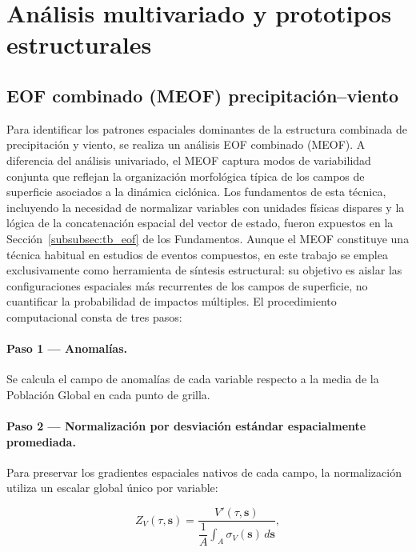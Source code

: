 
\section{Análisis multivariado y prototipos estructurales}\label{sec:meof_prototipos}

\subsection{EOF combinado (MEOF) precipitación--viento}\label{subsec:eof_multivariado}

Para identificar los patrones espaciales dominantes de la estructura combinada de precipitación y viento, se realiza un análisis EOF combinado (MEOF). A diferencia del análisis univariado, el MEOF captura modos de variabilidad conjunta que reflejan la organización morfológica típica de los campos de superficie asociados a la dinámica ciclónica. Los fundamentos de esta técnica, incluyendo la necesidad de normalizar variables con unidades físicas dispares y la lógica de la concatenación espacial del vector de estado, fueron expuestos en la Sección~\ref{subsubsec:tb_eof} de los Fundamentos. Aunque el MEOF constituye una técnica habitual en estudios de eventos compuestos, en este trabajo se emplea exclusivamente como herramienta de síntesis estructural: su objetivo es aislar las configuraciones espaciales más recurrentes de los campos de superficie, no cuantificar la probabilidad de impactos múltiples. El procedimiento computacional consta de tres pasos:

\paragraph{Paso 1 — Anomalías.} Se calcula el campo de anomalías de cada variable respecto a la media de la Población Global en cada punto de grilla.

\paragraph{Paso 2 — Normalización por desviación estándar espacialmente promediada.} Para preservar los gradientes espaciales nativos de cada campo, la normalización utiliza un escalar global único por variable:

\begin{equation}
    Z_{V}(\tau, \mathbf{s}) = \frac{V'(\tau, \mathbf{s})}{\dfrac{1}{A}\displaystyle\int_{A} \sigma_{V}(\mathbf{s})\, d\mathbf{s}},
\end{equation}

